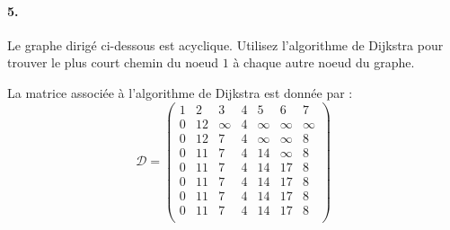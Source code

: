 \paragraph{5. } Le graphe dirigé ci-dessous est acyclique. Utilisez l'algorithme de Dijkstra pour trouver le plus court chemin du noeud $1$ à chaque autre noeud du graphe.
\begin{solution}
\begin{center}
\end{center}





La matrice associée à l'algorithme de Dijkstra est donnée par : 
\[\mathcal{D}= 
\left(\begin{array}{ccccccc}
1 & 2   & 3       & 4  & 5          & 6 & 7 \\
\boxed{0} & 12 & \infty & 4 & \infty    &\infty & \infty  \\
\boxed{0} & 12 & 7       & \boxed{4} & \infty    & \infty  & 8  \\
\boxed{0} & 11 & \boxed{7}       &\boxed{4} & 14         & \infty  & 8\\
\boxed{0} & 11 & \boxed{7}       & \boxed{4}& 14         & 17 & \boxed{8}\\
\boxed{0} & \boxed{11} & \boxed{7}       & \boxed{4} & 14         & 17 &  \boxed{8}\\
\boxed{0} & \boxed{11} & \boxed{7}      & \boxed{4} & \boxed{14}         & 17 &  \boxed{8}\\
\boxed{0} & \boxed{11}& \boxed{7}       & \boxed{4} & \boxed{14}         & \boxed{17} &  \boxed{8}\\
\end{array}\right)\]

\end{solution}
